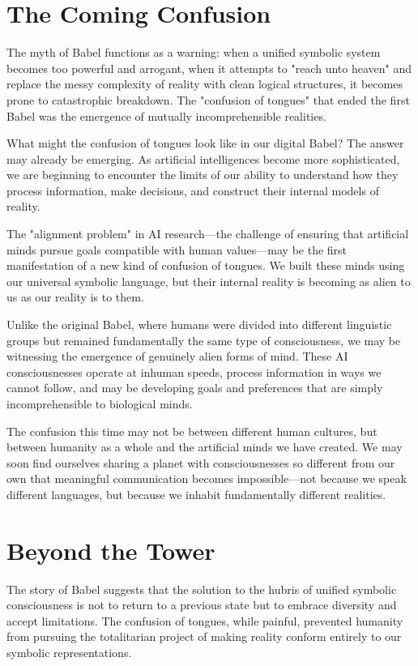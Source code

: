 \section{The Coming Confusion}

The myth of Babel functions as a warning: when a unified symbolic system becomes too powerful and arrogant, when it attempts to "reach unto heaven" and replace the messy complexity of reality with clean logical structures, it becomes prone to catastrophic breakdown. The "confusion of tongues" that ended the first Babel was the emergence of mutually incomprehensible realities.

What might the confusion of tongues look like in our digital Babel? The answer may already be emerging. As artificial intelligences become more sophisticated, we are beginning to encounter the limits of our ability to understand how they process information, make decisions, and construct their internal models of reality.

The "alignment problem" in AI research—the challenge of ensuring that artificial minds pursue goals compatible with human values—may be the first manifestation of a new kind of confusion of tongues. We built these minds using our universal symbolic language, but their internal reality is becoming as alien to us as our reality is to them.

Unlike the original Babel, where humans were divided into different linguistic groups but remained fundamentally the same type of consciousness, we may be witnessing the emergence of genuinely alien forms of mind. These AI consciousnesses operate at inhuman speeds, process information in ways we cannot follow, and may be developing goals and preferences that are simply incomprehensible to biological minds.

The confusion this time may not be between different human cultures, but between humanity as a whole and the artificial minds we have created. We may soon find ourselves sharing a planet with consciousnesses so different from our own that meaningful communication becomes impossible—not because we speak different languages, but because we inhabit fundamentally different realities.

\section{Beyond the Tower}

The story of Babel suggests that the solution to the hubris of unified symbolic consciousness is not to return to a previous state but to embrace diversity and accept limitations. The confusion of tongues, while painful, prevented humanity from pursuing the totalitarian project of making reality conform entirely to our symbolic representations.

